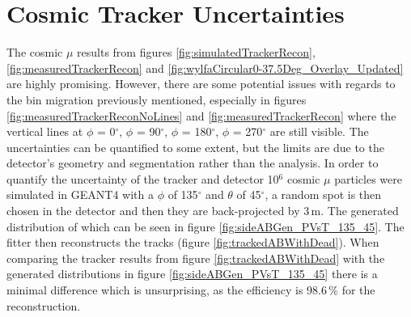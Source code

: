 \section{Cosmic Tracker Uncertainties}\label{sec:cosmicTrackerUncertainties}
The cosmic $\mu$ results from figures \ref{fig:simulatedTrackerRecon}, \ref{fig:measuredTrackerRecon} and \ref{fig:wylfaCircular0-37.5Deg_Overlay_Updated} are highly promising. However, there are some potential issues with regards to the bin migration previously mentioned, especially in figures \ref{fig:measuredTrackerReconNoLines} and \ref{fig:measuredTrackerRecon} where the vertical lines at $\phi$ = 0$^\circ$, $\phi$ = 90$^\circ$, $\phi$ = 180$^\circ$, $\phi$ = 270$^\circ$ are still visible. The uncertainties can be quantified to some extent, but the limits are due to the detector's geometry and segmentation rather than the analysis. In order to quantify the uncertainty of the tracker and detector 10$^6$ cosmic $\mu$ particles were simulated in GEANT4 with a $\phi$ of  135$^\circ$ and $\theta$ of 45$^\circ$, a random spot is then chosen in the detector and then they are back-projected by 3\,m. The generated distribution of which can be seen in figure \ref{fig:sideABGen_PVsT_135_45}. The fitter then reconstructs the tracks (figure \ref{fig:trackedABWithDead}). When comparing the tracker results from figure \ref{fig:trackedABWithDead} with the generated distributions in figure \ref{fig:sideABGen_PVsT_135_45} there is a minimal difference which is unsurprising, as the efficiency is 98.6\,\% for the reconstruction. 

